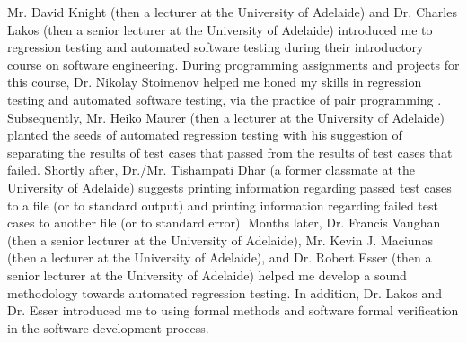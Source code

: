 \documentclass[letter,12pt]{article}
\begin{document}
Mr. David Knight (then a lecturer at the University of Adelaide) and Dr. Charles Lakos (then a senior lecturer at the University of Adelaide) introduced me to regression testing and automated software testing during their introductory course on software engineering. During programming assignments and projects for this course, Dr. Nikolay Stoimenov helped me honed my skills in regression testing and automated software testing, via the practice of pair programming \cite{DeOrio2016,Fox2013,Oram2011,Jalote2008,Shore2008,Wiegers2002}. Subsequently, Mr. Heiko Maurer (then a lecturer at the University of Adelaide) planted the seeds of automated regression testing with his suggestion of separating the results of test cases that passed from the results of test cases that failed. Shortly after, Dr./Mr. Tishampati Dhar (a former classmate at the University of Adelaide) suggests printing information regarding passed test cases to a file (or to standard output) and printing information regarding failed test cases to another file (or to standard error). Months later, Dr. Francis Vaughan (then a senior lecturer at the University of Adelaide), Mr. Kevin J. Maciunas (then a lecturer at the University of Adelaide), and Dr. Robert Esser (then a senior lecturer at the University of Adelaide) helped me develop a sound methodology towards automated regression testing. In addition, Dr. Lakos and Dr. Esser introduced me to using formal methods and software formal verification in the software development process.

\end{document}

